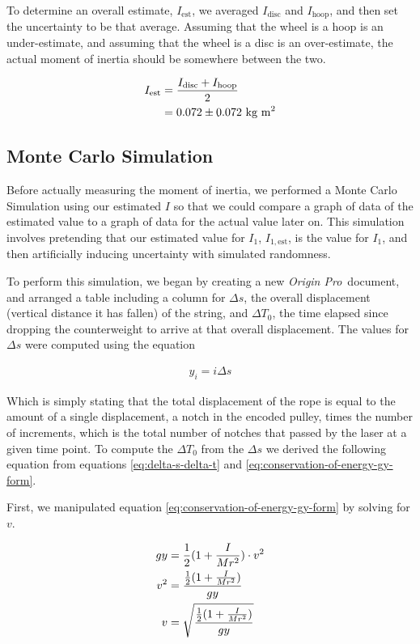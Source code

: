 \documentclass[coverpage]{article}
\newcommand{\softwareText}[1]{\textit{#1}\texttrademark}
\newcommand{\origin}{\softwareText{Origin Pro}}
\newcommand{\iUnit}{\text{kg $\text{m}^2$}}
\begin{document}
	To determine an overall estimate, $I_{\text{est}}$, we averaged $I_{\text{disc}}$ and $I_{\text{hoop}}$, and then set the uncertainty to be that average. Assuming that the wheel is a hoop is an under-estimate, and assuming that the wheel is a disc is an over-estimate, the actual moment of inertia should be somewhere between the two.
	
	\begin{align}
		I_{\text{est}}&=\frac{I_{\text{disc}} + I_{\text{hoop}}}{2} \notag \\
		&= 0.072 \pm 0.072\ \iUnit \label{eq:def-i-est}
	\end{align}

	\subsection{Monte Carlo Simulation}
	
	Before actually measuring the moment of inertia, we performed a Monte Carlo Simulation using our estimated $I$ so that we could compare a graph of data of the estimated value to a graph of data for the actual value later on. This simulation involves pretending that our estimated value for $I_1$, $I_{1, \text{est}}$, is the value for $I_1$, and then artificially inducing uncertainty with simulated randomness.
	
	To perform this simulation, we began by creating a new \origin~document, and arranged a table including a column for $\Delta{s}$, the overall displacement (vertical distance it has fallen) of the string, and $\Delta{T_0}$, the time elapsed since dropping the counterweight to arrive at that overall displacement. The values for $\Delta{s}$ were computed using the equation
	
	\begin{align}
		y_i=i \Delta{s}
	\end{align}

	Which is simply stating that the total displacement of the rope is equal to the amount of a single displacement, a notch in the encoded pulley, times the number of increments, which is the total number of notches that passed by the laser at a given time point. To compute the $\Delta{T_0}$ from the $\Delta{s}$ we derived the following equation from equations \ref{eq:delta-s-delta-t} and \ref{eq:conservation-of-energy-gy-form}.
	
	First, we manipulated equation \ref{eq:conservation-of-energy-gy-form} by solving for $v$.
	
	\begin{align}
		gy&=\frac{1}{2}(1 + \frac{I}{Mr^2}) \cdot v^2 \notag \\
		v^2&=\frac{\frac{1}{2}(1 + \frac{I}{Mr^2})}{gy} \notag \\
		v&=\sqrt{\frac{\frac{1}{2}(1 + \frac{I}{Mr^2})}{gy}} \label{eq:equation-for-v}
	\end{align}
	
\end{document}
